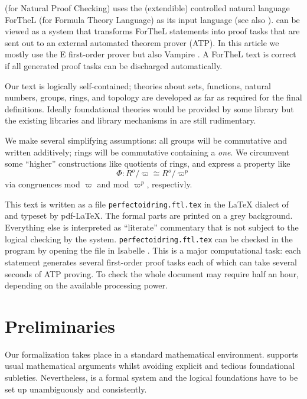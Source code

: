 \documentclass[11pt]{article}
\begin{document}
\Naproche (for Natural Proof Checking) uses the (extendible) 
controlled natural language ForTheL (for Formula Theory Language)
as its
input language (see also \cite{Paskevich2007}). 
\Naproche can be viewed as a system that
transforms ForTheL statements into proof tasks that are sent out
to an external automated theorem prover (ATP). In this article we
mostly use the E first-order prover \cite{Eprover} but also Vampire \cite{Vampire}.
A ForTheL text is correct if
all generated proof tasks can be discharged automatically. 

Our text is logically self-contained; theories 
about sets, functions, natural numbers, groups, rings, and topology are
developed as far as required for the final definitions. 
Ideally foundational theories would be provided by some library
but the existing libraries and library mechanisms in \Naproche 
are still rudimentary.

We make
several simplifying assumptions:
all groups will be commutative and written additively;
rings will be commutative containing a \textit{one}.
We circumvent some ``higher'' constructions like quotients of rings,
and express a property like
\[\Phi : R^o / \varpi \cong R^o / \varpi^{p}\]
via congruences mod $\varpi$ and mod $\varpi^{p}$, respectivly.


This text is written as a file 
\texttt{perfectoidring.ftl.tex}
in the \LaTeX{} dialect of \Naproche and
typeset by pdf-\LaTeX. The formal parts are printed on a grey background. 
Everything else
is interpreted as ``literate'' commentary that is not subject to the 
logical checking by the system.
\texttt{perfectoidring.ftl.tex}
can be checked in the \Naproche program by opening the file in Isabelle
\cite{Isabelle}.
This is a major computational task: each statement generates several
first-order proof tasks each of which can take several seconds of
ATP proving. To check the whole document may require half an hour, 
depending on the available processing power.

\part{Preliminaries}

Our formalization takes place in a  standard mathematical environment. 
\Naproche supports usual mathematical arguments whilst avoiding explicit and tedious foundational
subleties. Nevertheless, \Naproche is a formal system and the logical foundations
have to be set up unambiguously and consistently.
\end{document}
